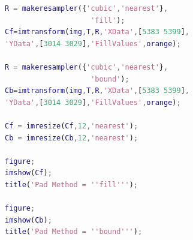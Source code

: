 \documentclass[conference]{IEEEtran}
\begin{document}
\clearpage

\begin{lstlisting}[language=Matlab]
% Compare 'fill' and 'bound' Pad Method
R = makeresampler({'cubic','nearest'},
                    'fill');
Cf=imtransform(img,T,R,'XData',[5383 5399],
'YData',[3014 3029],'FillValues',orange);

R = makeresampler({'cubic','nearest'},
                    'bound');
Cb=imtransform(img,T,R,'XData',[5383 5399],
'YData',[3014 3029],'FillValues',orange);

Cf = imresize(Cf,12,'nearest');
Cb = imresize(Cb,12,'nearest');

figure;
imshow(Cf); 
title('Pad Method = ''fill''');

figure;
imshow(Cb); 
title('Pad Method = ''bound''');
\end{lstlisting}
\end{document}
